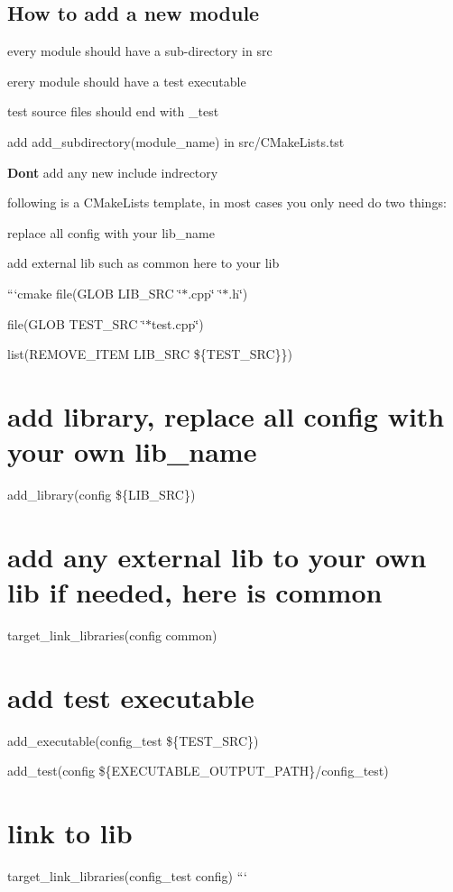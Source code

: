 \subsection*{How to add a new module}


\begin{DoxyItemize}
\item every module should have a sub-\/directory in {\ttfamily src}
\item erery module should have a test executable
\item test source files should end with {\ttfamily \+\_\+test}
\item add {\ttfamily add\+\_\+subdirectory(module\+\_\+name)} in {\ttfamily src/\+C\+Make\+Lists.\+tst}
\item {\bfseries Don\textquotesingle{}t} add any new include indrectory
\item following is a {\ttfamily C\+Make\+Lists} template, in most cases you only need do two things\+:
\begin{DoxyEnumerate}
\item replace all {\ttfamily config} with your {\ttfamily lib\+\_\+name}
\item add external lib such as {\ttfamily common} here to your lib
\end{DoxyEnumerate}
\end{DoxyItemize}

```cmake file(G\+L\+OB L\+I\+B\+\_\+\+S\+RC \char`\"{}$\ast$.\+cpp\char`\"{} \char`\"{}$\ast$.\+h\char`\"{})

file(G\+L\+OB T\+E\+S\+T\+\_\+\+S\+RC \char`\"{}$\ast$test.\+cpp\char`\"{})

list(R\+E\+M\+O\+V\+E\+\_\+\+I\+T\+EM L\+I\+B\+\_\+\+S\+RC \$\{T\+E\+S\+T\+\_\+\+S\+RC\}\})

\section*{add library, replace all {\ttfamily config} with your own {\ttfamily lib\+\_\+name}}

add\+\_\+library(config \$\{L\+I\+B\+\_\+\+S\+RC\})

\section*{add any external lib to your own lib if needed, here is {\ttfamily common}}

target\+\_\+link\+\_\+libraries(config common)

\section*{add test executable}

add\+\_\+executable(config\+\_\+test \$\{T\+E\+S\+T\+\_\+\+S\+RC\})

add\+\_\+test(config \$\{E\+X\+E\+C\+U\+T\+A\+B\+L\+E\+\_\+\+O\+U\+T\+P\+U\+T\+\_\+\+P\+A\+TH\}/config\+\_\+test)

\section*{link to lib}

target\+\_\+link\+\_\+libraries(config\+\_\+test config) ``` 